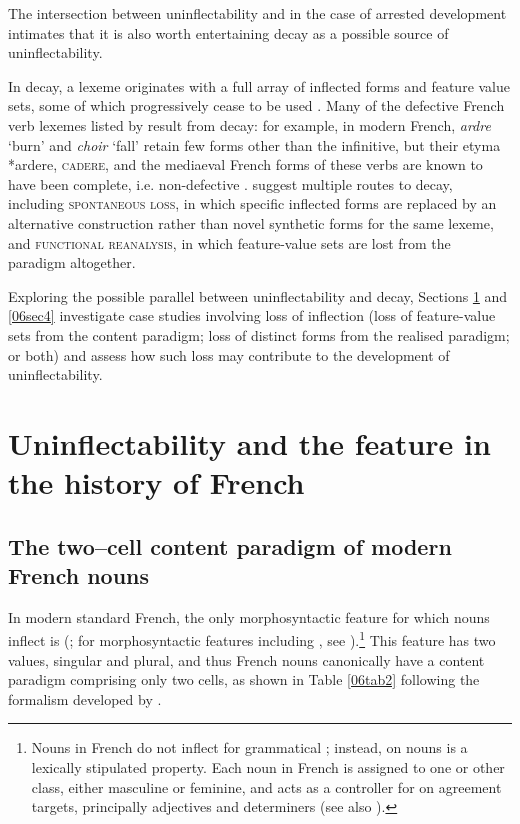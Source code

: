 \documentclass[output=paper,colorlinks,citecolor=brown]{langscibook}
\begin{document}
The intersection between uninflectability and  in the case of arrested development intimates that it is also worth entertaining decay as a possible source of uninflectability.

In decay, a lexeme originates with a full array of inflected forms and feature value sets, some of which progressively cease to be used \citep[14]{baermancorbett2010}. Many of the defective French verb lexemes listed by \citet[1273--1287]{grevissegoosse1991} result from decay: for example, in modern French, \emph{ardre} `burn' and \emph{choir} `fall' retain few forms other than the infinitive, but their  etyma *ardere, \textsc{cadere}, and the mediaeval French forms of these verbs are known to have been complete, i.e. non-defective \citep[392]{buridant2019}. \citet[14--15]{baermancorbett2010} suggest multiple routes to decay, including \textsc{spontaneous loss}, in which specific inflected forms are replaced by an alternative construction rather than novel synthetic forms for the same lexeme, and \textsc{functional reanalysis}, in which feature-value sets are lost from the paradigm altogether.

Exploring the possible parallel between uninflectability and decay, Sections \ref{06sec3} and \ref{06sec4} investigate case studies involving loss of inflection (loss of feature-value sets from the content paradigm; loss of distinct forms from the realised paradigm; or both) and assess how such loss may contribute to the development of uninflectability.

\section{Uninflectability and the feature \textsc{} in the history of French} \label{06sec3}

\subsection{The two--cell content paradigm of modern French nouns} \label{06sec3.1}

In modern standard French, the only morphosyntactic feature for which nouns inflect is \textsc{} (\citealt{bach2024}; for morphosyntactic features including \textsc{}, see \citealt[49--50, 73--74, 121]{corbett2012}).\footnote{Nouns in French do not inflect for grammatical \textsc{} \citep{bach2024}; instead,  on nouns is a lexically stipulated property. Each noun in French is assigned to one or other  class, either masculine or feminine, and acts as a controller for  on agreement targets, principally adjectives and determiners (see also \citealt{corbett2012, bachesher2023}).} This feature has two values, singular and plural, and thus French nouns canonically have a content paradigm comprising only two cells, as shown in Table \ref{06tab2} following the formalism developed by \citet[103--115]{stump2016}.
\end{document}
